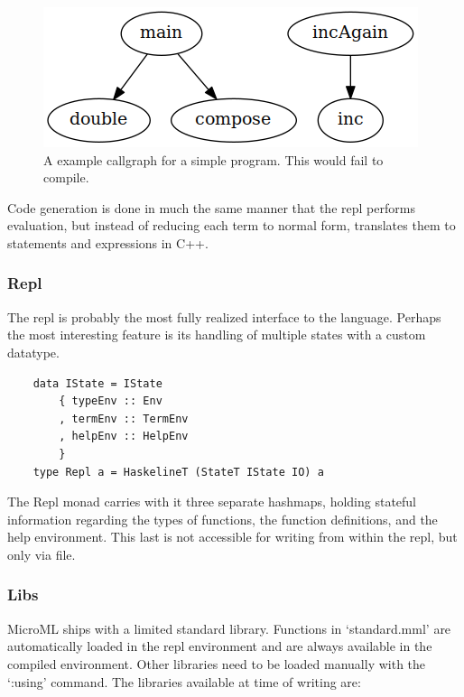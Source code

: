 \documentclass[12pt, a4paper]{report}
\begin{document}
\begin{figure}
    \includegraphics[scale=0.4]{images/callgraph.png}
    {\caption{A example callgraph for a simple program. This would fail to compile.}}
    \label{fig:callgraph}
\end{figure}

Code generation is done in much the same manner that the repl performs evaluation, but instead of
reducing each term to normal form, translates them to statements and expressions in C++. 

\subsubsection{Repl}
The repl is probably the most fully realized interface to the language. Perhaps the most interesting
feature is its handling of multiple states with a custom datatype. 

\begin{verbatim}
    data IState = IState
        { typeEnv :: Env
        , termEnv :: TermEnv
        , helpEnv :: HelpEnv
        }
    type Repl a = HaskelineT (StateT IState IO) a
\end{verbatim}

The Repl monad carries with it three separate hashmaps, holding stateful information regarding the
types of functions, the function definitions, and the help environment. This last is not accessible
for writing from within the repl, but only via file.

\subsubsection{Libs}
MicroML ships with a limited standard library. Functions in `standard.mml' are automatically loaded
in the repl environment and are always available in the compiled environment. Other libraries need
to be loaded manually with the `:using' command. The libraries available at time of writing are:
\end{document}
